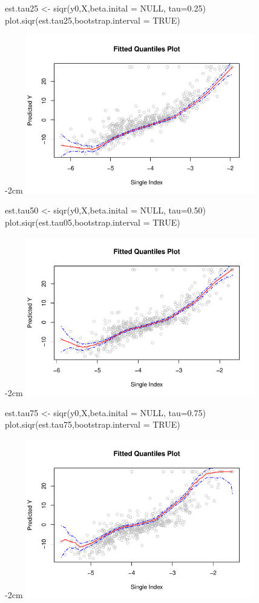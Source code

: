 \begin{Schunk}
\begin{Sinput}
  est.tau25 <- siqr(y0,X,beta.inital = NULL, tau=0.25)
  plot.siqr(est.tau25,bootstrap.interval = TRUE)
\end{Sinput}

\centering
\addtolength{\leftskip} {-2cm}
\addtolength{\rightskip}{-2cm}
\includegraphics[width=10cm]{siqr_files/figure-latex/unnamed-chunk-2-1} 


\begin{Sinput}
  est.tau50 <- siqr(y0,X,beta.inital = NULL, tau=0.50)
  plot.siqr(est.tau05,bootstrap.interval = TRUE)
\end{Sinput}

\centering
\addtolength{\leftskip} {-2cm}
\addtolength{\rightskip}{-2cm}
\includegraphics[width=10cm]{siqr_files/figure-latex/unnamed-chunk-3-1} 

\begin{Sinput}
  est.tau75 <- siqr(y0,X,beta.inital = NULL, tau=0.75)
  plot.siqr(est.tau75,bootstrap.interval = TRUE)
\end{Sinput}

\centering
\addtolength{\leftskip} {-2cm}
\addtolength{\rightskip}{-2cm}
\includegraphics[width=10cm]{siqr_files/figure-latex/unnamed-chunk-4-1} 


\end{Schunk}
